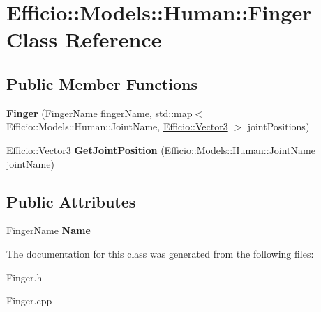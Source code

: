 \hypertarget{class_efficio_1_1_models_1_1_human_1_1_finger}{}\section{Efficio\+:\+:Models\+:\+:Human\+:\+:Finger Class Reference}
\label{class_efficio_1_1_models_1_1_human_1_1_finger}
\subsection*{Public Member Functions}
\begin{DoxyCompactItemize}
\item 
{\bfseries Finger} (Finger\+Name finger\+Name, std\+::map$<$ Efficio\+::\+Models\+::\+Human\+::\+Joint\+Name, \hyperlink{class_efficio_1_1_vector3}{Efficio\+::\+Vector3} $>$ joint\+Positions)\hypertarget{class_efficio_1_1_models_1_1_human_1_1_finger_af50ea3b0f90fcb06b534fae022b4aa62}{}\label{class_efficio_1_1_models_1_1_human_1_1_finger_af50ea3b0f90fcb06b534fae022b4aa62}

\item 
\hyperlink{class_efficio_1_1_vector3}{Efficio\+::\+Vector3} {\bfseries Get\+Joint\+Position} (Efficio\+::\+Models\+::\+Human\+::\+Joint\+Name joint\+Name)\hypertarget{class_efficio_1_1_models_1_1_human_1_1_finger_a4c10fccb5ca87b762fe6752ec24d5052}{}\label{class_efficio_1_1_models_1_1_human_1_1_finger_a4c10fccb5ca87b762fe6752ec24d5052}

\end{DoxyCompactItemize}
\subsection*{Public Attributes}
\begin{DoxyCompactItemize}
\item 
Finger\+Name {\bfseries Name}\hypertarget{class_efficio_1_1_models_1_1_human_1_1_finger_ae73134fdf9c0ba485fce08abdf2e5e59}{}\label{class_efficio_1_1_models_1_1_human_1_1_finger_ae73134fdf9c0ba485fce08abdf2e5e59}

\end{DoxyCompactItemize}


The documentation for this class was generated from the following files\+:\begin{DoxyCompactItemize}
\item 
Finger.\+h\item 
Finger.\+cpp\end{DoxyCompactItemize}
